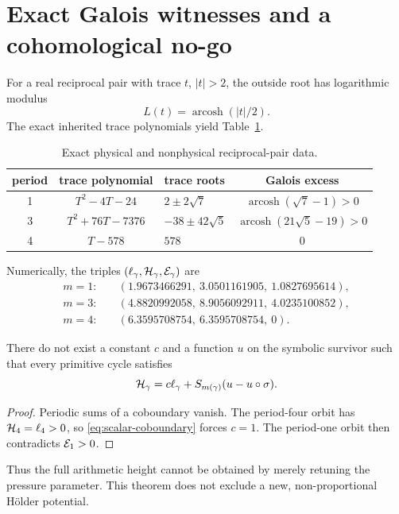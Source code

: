 \section{Exact Galois witnesses and a cohomological no-go}

For a real reciprocal pair with trace \(t\), \(|t|>2\), the outside root
has logarithmic modulus
\begin{equation}
L(t)=\operatorname{arcosh}(|t|/2).
\label{eq:pair-log}
\end{equation}
The exact inherited trace polynomials yield Table~\ref{tab:excess}.

\begin{table}[ht]
\centering
\caption{Exact physical and nonphysical reciprocal-pair data.}
\label{tab:excess}
\begin{tabular}{cclc}
\toprule
period & trace polynomial & trace roots & Galois excess \\
\midrule
1 & \(T^2-4T-24\) & \(2\pm2\sqrt7\) &
\(\operatorname{arcosh}(\sqrt7-1)>0\) \\
3 & \(T^2+76T-7376\) & \(-38\pm42\sqrt5\) &
\(\operatorname{arcosh}(21\sqrt5-19)>0\) \\
4 & \(T-578\) & \(578\) & \(0\) \\
\bottomrule
\end{tabular}
\end{table}

Numerically, the triples
\((\ell_\gamma,\mathcal H_\gamma,\mathcal E_\gamma)\) are
\begin{align*}
m=1:&\quad(1.9673466291,\ 3.0501161905,\ 1.0827695614),\\
m=3:&\quad(4.8820992058,\ 8.9056092911,\ 4.0235100852),\\
m=4:&\quad(6.3595708754,\ 6.3595708754,\ 0).
\end{align*}

\begin{theorem}
There do not exist a constant \(c\) and a function \(u\) on the symbolic
survivor such that every primitive cycle satisfies
\begin{equation}
\mathcal H_\gamma
=c\ell_\gamma+S_{m(\gamma)}(u-u\circ\sigma).
\label{eq:scalar-coboundary}
\end{equation}
\end{theorem}

\begin{proof}
Periodic sums of a coboundary vanish.  The period-four orbit has
\(\mathcal H_4=\ell_4>0\), so \eqref{eq:scalar-coboundary} forces \(c=1\).
The period-one orbit then contradicts \(\mathcal E_1>0\).
\end{proof}

Thus the full arithmetic height cannot be obtained by merely retuning the
pressure parameter.  This theorem does not exclude a new, non-proportional
H\"older potential.
